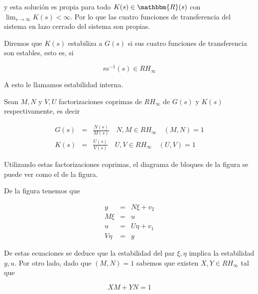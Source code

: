         y esta solución es propia para todo $K(s) \in \mathbbm{R}(s)$ con $\lim_{s \to \infty} K(s) < \infty$.
        Por lo que las cuatro funciones de transferencia del sistema en lazo cerrado del sistema son propias.

        Diremos que $K(s)$ estabiliza a $G(s)$ si sus cuatro funciones de transferencia son estables, esto es, si

        \begin{equation*}
            m^{-1}(s) \in RH_{\infty}
        \end{equation*}

        A esto le llamamos estabilidad interna.

        Sean $M, N$ y $V, U$ factorizaciones coprimas de $RH_\infty$ de $G(s)$ y $K(s)$ respectivamente, es decir

        \begin{eqnarray}
            G(s) & = & \frac{N(s)}{M(s)} \quad N, M \in RH_{\infty} \quad (M, N) = 1 \\
            K(s) & = & \frac{U(s)}{V(s)} \quad U, V \in RH_{\infty} \quad (U, V) = 1
        \end{eqnarray}

        Utilizando estas factorizaciones coprimas, el diagrama de bloques de la figura se puede ver como el de la figura.


        De la figura tenemos que

        \begin{eqnarray} \label{eq:robus1}
            y & = & N \xi + v_2 \nonumber \\
            M \xi & = & u \nonumber \\
            u & = & U \eta + v_1 \nonumber \\
            V \eta & = & y
        \end{eqnarray}

        De estas ecuaciones se deduce que la estabilidad del par $\xi, \eta$ implica la estabilidad $y, u$.
        Por otro lado, dado que $(M, N) = 1$ sabemos que existen $X, Y \in RH_{\infty}$ tal que

        \begin{equation}
            X M + Y N = 1
        \end{equation}

